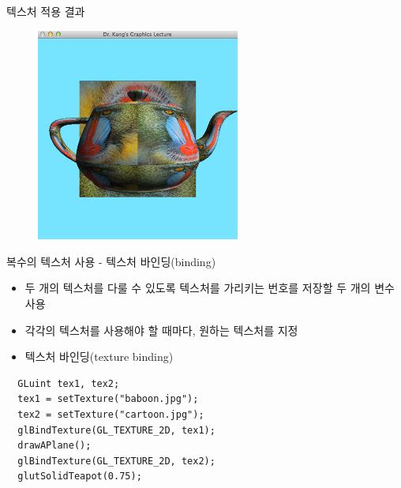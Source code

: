 \documentclass{beamer}
\begin{document}
\begin{frame}[fragile]{텍스처 적용 결과}

\begin{figure}[h!]
  \centering
	\includegraphics[height=7cm]{OGL_texture/textureImageApplied.png}
\end{figure}

\end{frame}


\begin{frame}[fragile]{복수의 텍스처 사용 - 텍스처 바인딩(binding)}

\begin{itemize}
\item 두 개의 텍스처를 다룰 수 있도록 텍스처를 가리키는 번호를 저장할 두 개의 변수 사용
\item 각각의 텍스처를 사용해야 할 때마다, 원하는 텍스처를 지정
\item 텍스처 바인딩(texture binding)
\end{itemize}

\lstset{language=C++, escapechar=^} 
\begin{lstlisting}
  GLuint tex1, tex2;
  tex1 = setTexture("baboon.jpg");
  tex2 = setTexture("cartoon.jpg");
  glBindTexture(GL_TEXTURE_2D, tex1);
  drawAPlane();
  glBindTexture(GL_TEXTURE_2D, tex2);
  glutSolidTeapot(0.75);
\end{lstlisting}

\end{frame}
\end{document}
